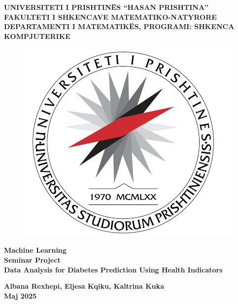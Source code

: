 \clearpage
\thispagestyle{empty}

\begin{normalsize}
    \begin{center}
        \textbf{UNIVERSITETI I PRISHTINËS “HASAN PRISHTINA” \\
        FAKULTETI I SHKENCAVE MATEMATIKO-NATYRORE\\
        DEPARTAMENTI I MATEMATIKËS, 
        PROGRAMI: SHKENCA KOMPJUTERIKE}
      \vspace{0.5in}
        
        \begin{figure}[h]
             \center
            \includegraphics[scale=0.4]{images/up_logo.png}
        \end{figure}
        \vspace{0.5in}
        
        \Large{\textbf{Machine Learning \\ Seminar Project\\ Data Analysis for Diabetes Prediction Using Health Indicators}}
    \end{center}
\vspace{1in}

\setlength{\parindent}{7cm}

\begin{center}
    \textbf{Albana Rexhepi, Eljesa Kqiku, Kaltrina Kuka}\\ 
    \vspace{0.2cm}
  \textbf{Maj 2025}  
\end{center}
\end{normalsize}
\newpage